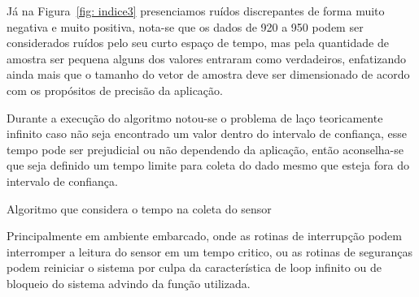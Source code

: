 Já na Figura~\ref{fig: indice3} presenciamos ruídos discrepantes de forma muito negativa e muito positiva, nota-se que os dados de 920 a 950 podem ser considerados ruídos pelo seu curto espaço de tempo, mas pela quantidade de amostra ser pequena alguns dos valores entraram como verdadeiros, enfatizando ainda mais que o tamanho do vetor de amostra deve ser dimensionado de acordo com os propósitos de precisão da aplicação.

Durante a execução do algoritmo notou-se o problema de laço teoricamente infinito caso não seja encontrado um valor dentro do intervalo de confiança, esse tempo pode ser prejudicial ou não dependendo da aplicação, então aconselha-se que seja definido um tempo limite para coleta do dado mesmo que esteja fora do intervalo de confiança. 

\begin{algorithm}[H]
    \caption{Algoritmo que considera o tempo na coleta do sensor}
    \label{algoritmo:alg_com_temp}
\end{algorithm}

Principalmente em ambiente embarcado, onde as rotinas de interrupção podem interromper a leitura do sensor em um tempo critico, ou as rotinas de seguranças podem reiniciar o sistema por culpa da característica de loop infinito ou de bloqueio do sistema advindo da função utilizada.